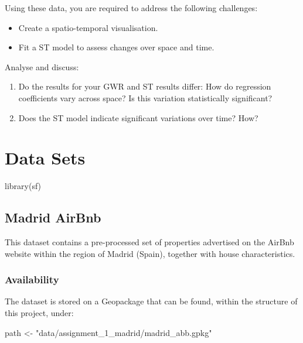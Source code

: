 \documentclass[
  letterpaper,
  DIV=11,
  numbers=noendperiod,
  oneside]{scrreprt}
\newenvironment{Shaded}{\begin{snugshade}}{\end{snugshade}}
\newcommand{\FunctionTok}[1]{\textcolor[rgb]{0.28,0.35,0.67}{#1}}
\newcommand{\NormalTok}[1]{\textcolor[rgb]{0.00,0.23,0.31}{#1}}
\newcommand{\OtherTok}[1]{\textcolor[rgb]{0.00,0.23,0.31}{#1}}
\newcommand{\StringTok}[1]{\textcolor[rgb]{0.13,0.47,0.30}{#1}}
\providecommand{\tightlist}{%
  \setlength{\itemsep}{0pt}\setlength{\parskip}{0pt}}\usepackage{longtable,booktabs,array}
\begin{document}
Using these data, you are required to address the following challenges:

\begin{itemize}
\item
  Create a spatio-temporal visualisation.
\item
  Fit a ST model to assess changes over space and time.
\end{itemize}

Analyse and discuss:

\begin{enumerate}
\def\labelenumi{\arabic{enumi}.}
\tightlist
\item
  Do the results for your GWR and ST results differ: How do regression
  coefficients vary across space? Is this variation statistically
  significant?
\item
  Does the ST model indicate significant variations over time? How?
\end{enumerate}


\chapter{Data Sets}\label{sec-chp11}

\begin{Shaded}
\begin{Highlighting}[]
\FunctionTok{library}\NormalTok{(sf)}
\end{Highlighting}
\end{Shaded}

\section{Madrid AirBnb}\label{madrid-airbnb}

This dataset contains a pre-processed set of properties advertised on
the AirBnb website within the region of Madrid (Spain), together with
house characteristics.

\subsection*{Availability}\label{availability}

The dataset is stored on a Geopackage that can be found, within the
structure of this project, under:

\begin{Shaded}
\begin{Highlighting}[]
\NormalTok{path }\OtherTok{\textless{}{-}} \StringTok{"data/assignment\_1\_madrid/madrid\_abb.gpkg"}
\end{Highlighting}
\end{Shaded}
\end{document}

